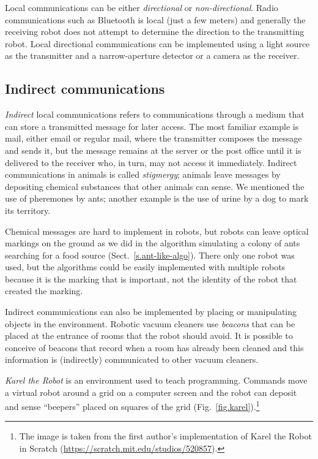 Local communications can be either \emph{directional} or \emph{non-directional}. Radio communications such as Bluetooth is local (just a few meters) and generally the receiving robot does not attempt to determine the direction to the transmitting robot. Local directional communications can be implemented using a light source as the transmitter and a narrow-aperture detector or a camera as the receiver.

\subsection{Indirect communications}

\emph{Indirect} local communications refers to communications through a medium that can store a transmitted message for later access. The most familiar example is mail, either email or regular mail, where the transmitter composes the message and sends it, but the message remains at the server or the post office until it is delivered to the receiver who, in turn, may not access it immediately. Indirect communications in animals is called \emph{stigmergy}; animals leave messages by depositing chemical substances that other animals can sense. We mentioned the use of pheremones by ants; another example is the use of urine by a dog to mark its territory.

Chemical messages are hard to implement in robots, but robots can leave optical markings on the ground as we did in the algorithm simulating a colony of ants searching for a food source (Sect.~\ref{s.ant-like-algo}). There only one robot was used, but the algorithms could be easily implemented with multiple robots because it is the marking that is important, not the identity of the robot that created the marking.

Indirect communications can also be implemented by placing or manipulating objects in the environment. Robotic vacuum cleaners use \emph{beacons} that can be placed at the entrance of rooms that the robot should avoid. It is possible to conceive of beacons that record when a room has already been cleaned and this information is (indirectly) communicated to other vacuum cleaners.

\emph{Karel the Robot} is an environment used to teach programming. Commands move a virtual robot around a grid on a computer screen and the robot can deposit and sense ``beepers'' placed on squares of the grid (Fig.~\ref{fig.karel}).\footnote{The image is taken from the first author's implementation of Karel the Robot in Scratch (\url{https://scratch.mit.edu/studios/520857}).}

